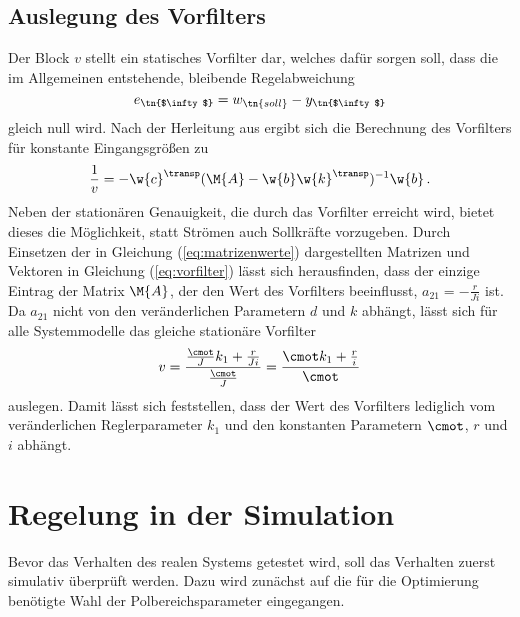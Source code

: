 \subsection{Auslegung des Vorfilters}
Der Block $v$ stellt ein statisches Vorfilter dar, welches dafür sorgen soll, dass die im Allgemeinen entstehende, bleibende Regelabweichung 
\begin{equation}\label{eq:stationärer endwert}
e_\tn{$\infty$} = w_\tn{soll} - y_\tn{$\infty$}
\end{equation}
gleich null wird. Nach der Herleitung aus \cite{Adamy.2016} ergibt sich die Berechnung des Vorfilters für konstante Eingangsgrößen zu
\begin{equation}\label{eq:vorfilter}
\frac{1}{v} = -\w{c}^\transp (\M{A} - \w{b} \w{k}^\transp)^{-1} \w{b} \, .
\end{equation}
Neben der stationären Genauigkeit, die durch das Vorfilter erreicht wird, bietet dieses die Möglichkeit, statt Strömen auch Sollkräfte vorzugeben. Durch Einsetzen der in Gleichung (\ref{eq:matrizenwerte}) dargestellten Matrizen und Vektoren in Gleichung (\ref{eq:vorfilter}) lässt sich herausfinden, dass der einzige Eintrag der Matrix $\M{A}$, der den Wert des Vorfilters beeinflusst, $a_{21} = -\frac{r}{Ji}$ ist. Da $a_{21}$ nicht von den veränderlichen Parametern $d$ und $k$ abhängt, lässt sich für alle Systemmodelle das gleiche stationäre Vorfilter 
\begin{equation}\label{eq:wert vorfilter}
v = \frac{\frac{\cmot}{J} k_1 + \frac{r}{Ji}}{\frac{\cmot}{J}} = \frac{\cmot k_1 + \frac{r}{i}}{\cmot}
\end{equation} 
auslegen. Damit lässt sich feststellen, dass der Wert des Vorfilters lediglich vom veränderlichen Reglerparameter $k_1$ und den konstanten Parametern $\cmot$, $r$ und $i$ abhängt.

\section{Regelung in der Simulation}\label{sec:simulation}
Bevor das Verhalten des realen Systems getestet wird, soll das Verhalten zuerst simulativ überprüft werden. Dazu wird zunächst auf die für die Optimierung benötigte Wahl der Polbereichsparameter eingegangen.

